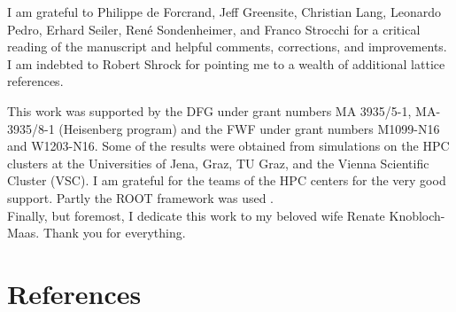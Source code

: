 \documentclass[final,12pt,3p,longtitle]{elsarticle}
\newcommand*{\1}{1\!\!\!\bot}
\begin{document}
I am grateful to Philippe de Forcrand, Jeff Greensite, Christian Lang, Leonardo Pedro, Erhard Seiler, Ren\'e Sondenheimer, and Franco Strocchi for a critical reading of the manuscript and helpful comments, corrections, and improvements. I am indebted to Robert Shrock for pointing me to a wealth of additional lattice references.

This work was supported by the DFG under grant numbers MA 3935/5-1, MA-3935/8-1 (Heisenberg program) and the FWF under grant numbers M1099-N16 and W1203-N16. Some of the results were obtained from simulations on the HPC clusters at the Universities of Jena, Graz, TU Graz, and the Vienna Scientific Cluster (VSC). I am grateful for the teams of the HPC centers for the very good support. Partly the ROOT framework was used \cite{Brun:1997pa}.\\

Finally, but foremost, I dedicate this work to my beloved wife Renate Knobloch-Maas. Thank you for everything.

\section*{References}



\end{document}
